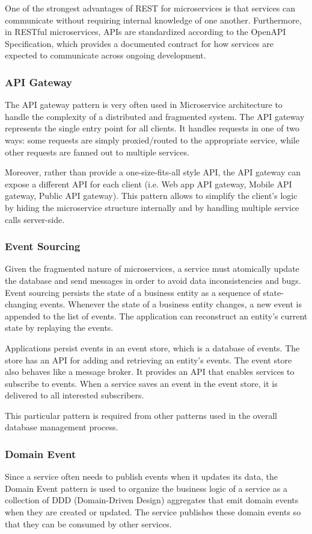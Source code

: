 One of the strongest advantages of REST for microservices is that services can communicate without requiring internal knowledge of one another. Furthermore, in RESTful microservices, APIs are standardized according to the OpenAPI Specification, which provides a documented contract for how services are expected to communicate across ongoing development.

\subsubsection{API Gateway}
The API gateway pattern is very often used in Microservice architecture to handle the complexity of a distributed and fragmented system. The API gateway represents the single entry point for all clients. It handles requests in one of two ways: some requests are simply proxied/routed to the appropriate service, while other requests are fanned out to multiple services. 

Moreover, rather than provide a one-size-fits-all style API, the API gateway can expose a different API for each client (i.e. Web app API gateway, Mobile API gateway, Public API gateway). This pattern allows to simplify the client’s logic by hiding the microservice structure internally and by handling multiple service calls server-side.

\subsubsection{Event Sourcing}
Given the fragmented nature of microservices, a service must atomically update the database and send messages in order to avoid data inconsistencies and bugs.  Event sourcing persists the state of a business entity as a sequence of state-changing events. Whenever the state of a business entity changes, a new event is appended to the list of events. The application can reconstruct an entity’s current state by replaying the events.

Applications persist events in an event store, which is a database of events. The store has an API for adding and retrieving an entity’s events. The event store also behaves like a message broker. It provides an API that enables services to subscribe to events. When a service saves an event in the event store, it is delivered to all interested subscribers.

This particular pattern is required from other patterns used in the overall database management process.

\subsubsection{Domain Event}
Since a service often needs to publish events when it updates its data, the Domain Event pattern is used to organize the business logic of a service as a collection of DDD (Domain-Driven Design) aggregates that emit domain events when they are created or updated. The service publishes these domain events so that they can be consumed by other services. 

